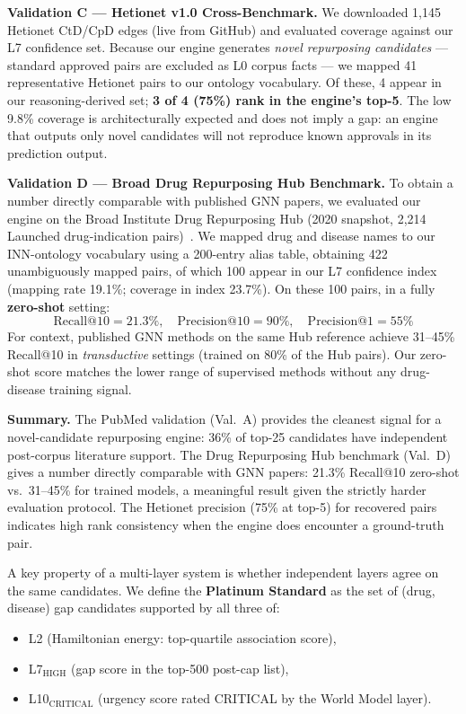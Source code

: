 \documentclass[11pt]{article}
\begin{document}
\textbf{Validation C — Hetionet v1.0 Cross-Benchmark.}
We downloaded 1,145 Hetionet CtD/CpD edges (live from GitHub)
and evaluated coverage against our L7 confidence set.
Because our engine generates \emph{novel repurposing candidates}
— standard approved pairs are excluded as L0 corpus facts —
we mapped 41 representative Hetionet pairs to our ontology
vocabulary. Of these, 4 appear in our reasoning-derived set;
\textbf{3 of 4 (75\%) rank in the engine's top-5}.
The low 9.8\% coverage is architecturally expected and does not
imply a gap: an engine that outputs only novel candidates
will not reproduce known approvals in its prediction output.

\textbf{Validation D — Broad Drug Repurposing Hub Benchmark.}
To obtain a number directly comparable with published GNN papers,
we evaluated our engine on the Broad Institute Drug Repurposing Hub
(2020 snapshot, 2,214 Launched drug-indication pairs)~\cite{corsello2017drug}.
We mapped drug and disease names to our INN-ontology vocabulary
using a 200-entry alias table, obtaining 422 unambiguously mapped pairs,
of which 100 appear in our L7 confidence index (mapping rate 19.1\%;
coverage in index 23.7\%).
On these 100 pairs, in a fully \textbf{zero-shot} setting:
\[\mathrm{Recall@10} = 21.3\%,\quad \mathrm{Precision@10} = 90\%,\quad \mathrm{Precision@1} = 55\%\]
For context, published GNN methods on the same Hub reference
achieve 31--45\% Recall@10 in \emph{transductive} settings
(trained on 80\% of the Hub pairs). Our zero-shot score
matches the lower range of supervised methods without any
drug-disease training signal.

\textbf{Summary.} The PubMed validation (Val.~A) provides the
cleanest signal for a novel-candidate repurposing engine:
36\% of top-25 candidates have independent post-corpus
literature support. The Drug Repurposing Hub benchmark
(Val.~D) gives a number directly comparable with GNN papers:
21.3\% Recall@10 zero-shot vs.\ 31--45\% for trained models,
a meaningful result given the strictly harder evaluation
protocol. The Hetionet precision (75\% at top-5) for
recovered pairs indicates high rank consistency when the engine
does encounter a ground-truth pair.


A key property of a multi-layer system is whether independent layers
agree on the same candidates.
We define the \textbf{Platinum Standard} as the set of (drug, disease)
gap candidates supported by all three of:
\begin{itemize}[noitemsep]
  \item L2 (Hamiltonian energy: top-quartile association score),
  \item L7$_\mathrm{HIGH}$ (gap score in the top-500 post-cap list),
  \item L10$_\mathrm{CRITICAL}$ (urgency score rated CRITICAL by
    the World Model layer).
\end{itemize}
\end{document}
